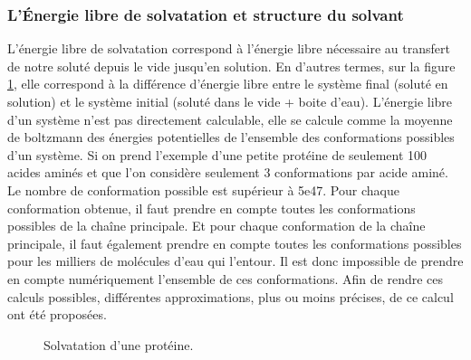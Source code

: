 \subsubsection{L'\'Energie libre de solvatation et structure du solvant}
L'énergie libre de solvatation correspond à l'énergie libre nécessaire au transfert de notre soluté depuis le vide jusqu'en solution. En d'autres termes, sur la figure \ref{fig:solvatation_def}, elle correspond à la différence d'énergie libre entre le système final (soluté en solution) et le système initial (soluté dans le vide + boite d'eau). L'énergie libre d'un système n'est pas directement calculable, elle se calcule comme la moyenne de boltzmann des énergies potentielles de l'ensemble des conformations possibles d'un système. Si on prend l'exemple d'une petite protéine de seulement 100 acides aminés et que l'on considère seulement 3 conformations par acide aminé. Le nombre de conformation possible est supérieur à 5e47. Pour chaque conformation obtenue, il faut prendre en compte toutes les conformations possibles de la chaîne principale. Et pour chaque conformation de la chaîne principale, il faut également prendre en compte toutes les conformations possibles pour les milliers de molécules d'eau qui l'entour. Il est donc impossible de prendre en compte numériquement l'ensemble de ces conformations. Afin de rendre ces calculs possibles, différentes approximations, plus ou moins précises, de ce calcul ont été proposées.


\begin{figure}[h]
  \center
      \caption{Solvatation d'une protéine.}
      \label{fig:solvatation_def}
\end{figure}



